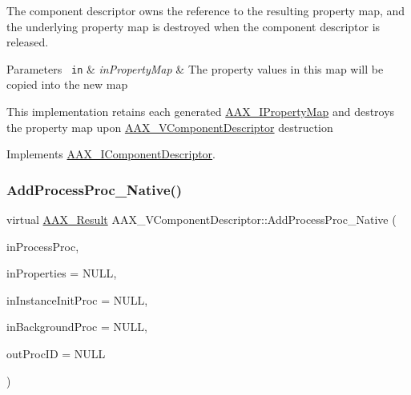 The component descriptor owns the reference to the resulting property map, and the underlying property map is destroyed when the component descriptor is released.


\begin{DoxyParams}[1]{Parameters}
\mbox{\texttt{ in}}  & {\em in\+Property\+Map} & The property values in this map will be copied into the new map\\
\hline
\end{DoxyParams}
This implementation retains each generated \mbox{\hyperlink{a01869}{A\+A\+X\+\_\+\+I\+Property\+Map}} and destroys the property map upon \mbox{\hyperlink{a01901}{A\+A\+X\+\_\+\+V\+Component\+Descriptor}} destruction 

Implements \mbox{\hyperlink{a01781_a107f2d11ba9165ef84162a76368f6ee6}{A\+A\+X\+\_\+\+I\+Component\+Descriptor}}.

\mbox{\label{a01901_a21e758a4ad757e694c183548fe58f0f0}} 
\subsubsection{\texorpdfstring{AddProcessProc\_Native()}{AddProcessProc\_Native()}}
{\footnotesize\ttfamily virtual \mbox{\hyperlink{a00392_a4d8f69a697df7f70c3a8e9b8ee130d2f}{A\+A\+X\+\_\+\+Result}} A\+A\+X\+\_\+\+V\+Component\+Descriptor\+::\+Add\+Process\+Proc\+\_\+\+Native (\begin{DoxyParamCaption}\item[{\mbox{\hyperlink{a00401_ad6dd5e1aa5bd2f8462966685e3b26a6e}{A\+A\+X\+\_\+\+C\+Process\+Proc}}}]{in\+Process\+Proc,  }\item[{\mbox{\hyperlink{a01869}{A\+A\+X\+\_\+\+I\+Property\+Map}} $\ast$}]{in\+Properties = {\ttfamily NULL},  }\item[{\mbox{\hyperlink{a00401_a3963a850079d3186e08c97a1a4d0ef1c}{A\+A\+X\+\_\+\+C\+Instance\+Init\+Proc}}}]{in\+Instance\+Init\+Proc = {\ttfamily NULL},  }\item[{\mbox{\hyperlink{a00401_aa64561d963284a3124a0821e7dc79c9a}{A\+A\+X\+\_\+\+C\+Background\+Proc}}}]{in\+Background\+Proc = {\ttfamily NULL},  }\item[{\mbox{\hyperlink{a00392_aeaf9b387f902c50a8360ff423f4a1f23}{A\+A\+X\+\_\+\+C\+Selector}} $\ast$}]{out\+Proc\+ID = {\ttfamily NULL} }\end{DoxyParamCaption})\hspace{0.3cm}{\ttfamily [virtual]}}



